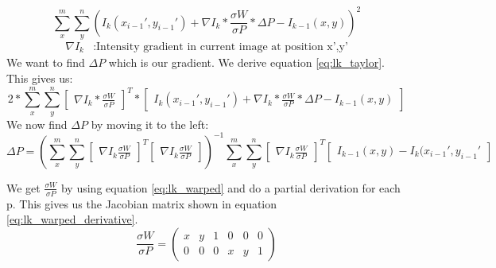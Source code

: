 \documentclass[11pt,a4paper,titlepage,oneside]{report}
\begin{document}
\begin{equation}\label{eq:lk_taylor}
  \sum_x^m\sum_y^n(I_{k}(x_{i-1}',y_{i-1}')+\nabla I_{k}*\frac{\sigma W}{\sigma P}*\Delta P-I_{k-1}(x,y))^2
\end{equation}
\begin{align*}
  \nabla I_k  &:  \text{Intensity gradient in current image at position x',y'}
\end{align*}
We want to find $\Delta P$ which is our gradient. We derive equation \ref{eq:lk_taylor}. This gives us:
\begin{equation}
  2*\sum_x^m\sum_y^n\begin{bmatrix}\nabla I_{k}*\frac{\sigma W}{\sigma P}\end{bmatrix}^T*\begin{bmatrix}I_{k}(x_{i-1}',y_{i-1}')+\nabla I_{k}*\frac{\sigma W}{\sigma P}*\Delta P-I_{k-1}(x,y)\end{bmatrix}
\end{equation}
We now find $\Delta P$ by moving it to the left:
\tiny
\begin{equation}\label{eq:lk_dp}
  \Delta P=(\sum_x^m\sum_y^n\begin{bmatrix}\nabla I_{k}\frac{\sigma W}{\sigma P}\end{bmatrix}^T\begin{bmatrix}\nabla I_{k}\frac{\sigma W}{\sigma P}\end{bmatrix})^{-1}
  \sum_x^m\sum_y^n\begin{bmatrix}\nabla I_{k}\frac{\sigma W}{\sigma P}\end{bmatrix}^T\begin{bmatrix}I_{k-1}(x,y) - I_{k}(x_{i-1}',y_{i-1}'\end{bmatrix}
\end{equation}
\normalsize

We get $\frac{\sigma W}{\sigma P}$ by using equation \ref{eq:lk_warped} and do a partial derivation for each p. This gives us the Jacobian matrix shown in equation \ref{eq:lk_warped_derivative}.
\begin{equation}\label{eq:lk_warped_derivative}
  \frac{\sigma W}{\sigma P}=
  \begin{pmatrix}
    x & y & 1 & 0 & 0 & 0 \\
    0 & 0 & 0 & x & y & 1
  \end{pmatrix}
\end{equation}
\end{document}

